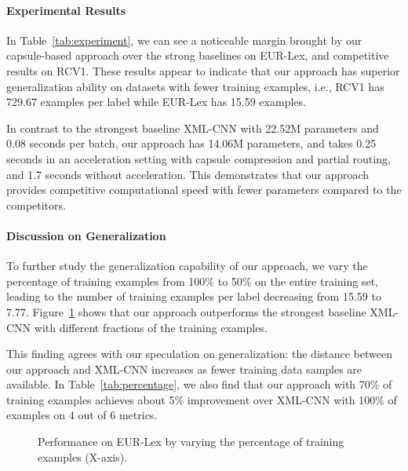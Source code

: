 \documentclass[11pt,a4paper]{article}
\newcommand{\1}{\boldsymbol{1}}
\begin{document}
\paragraph{Experimental Results}
In Table~\ref{tab:experiment},
we can see a noticeable margin brought by our capsule-based approach over the strong baselines on EUR-Lex, and competitive results on RCV1. 
These results appear to indicate that our approach 
has superior generalization ability 
on datasets with fewer training examples, i.e., RCV1 has 729.67 examples per label while EUR-Lex has 15.59 examples.

In contrast to the strongest baseline XML-CNN with 22.52M parameters and 0.08 seconds per batch, our approach has 14.06M parameters, and takes 0.25 seconds in an acceleration setting with capsule compression and partial routing, and 1.7 seconds without acceleration.
This demonstrates that our approach 
provides competitive computational speed with fewer parameters compared to the competitors.

\paragraph{Discussion on Generalization}
To further study the generalization capability of our approach, we 
vary the percentage of training examples from 100\% to 50\% on the entire training set, 
leading to 
the 
number of training examples per label 
decreasing
from 15.59 to 7.77. Figure~\ref{fig:percentage} shows that our approach outperforms 
the strongest baseline XML-CNN with different fractions of the training examples. 

This finding agrees with our speculation on generalization:
the distance between our approach and XML-CNN increases as fewer training data samples are available. In Table~\ref{tab:percentage}, we also find that our approach with 70\% of training examples achieves about 5\% improvement over XML-CNN with 100\% of examples on 4 out of 6 metrics.

\begin{figure}[t]
\centering
{}
\caption{Performance on EUR-Lex by varying the percentage of training examples (X-axis).}\label{fig:percentage}
\vspace{-5pt}
\end{figure}
\end{document}
